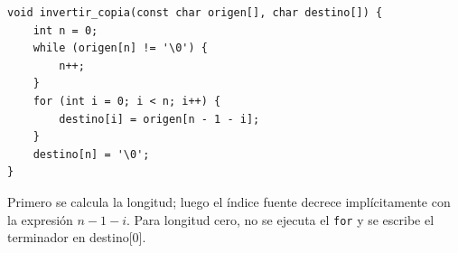 \begin{enumerate}[label=\textbf{\arabic*.}]
\ifpauta\begin{solucionbox}\begin{lstlisting}[style=customc]
void invertir_copia(const char origen[], char destino[]) {
    int n = 0;
    while (origen[n] != '\0') {
        n++;
    }
    for (int i = 0; i < n; i++) {
        destino[i] = origen[n - 1 - i];
    }
    destino[n] = '\0';
}
\end{lstlisting}Primero se calcula la longitud; luego el índice fuente decrece implícitamente con la expresión $n-1-i$. Para longitud cero, no se ejecuta el \texttt{for} y se escribe el terminador en destino[0].\end{solucionbox}\else\vspace{3cm}\fi
\end{enumerate}


